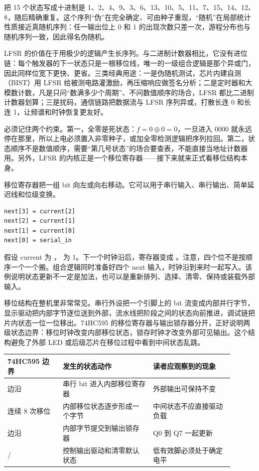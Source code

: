 把 15 个状态写成十进制是 1、2、4、9、3、6、13、10、5、11、7、15、14、12、8，随后精确重复。这个序列“伪”在完全确定、可由种子重现，“随机”在局部统计性质接近真随机序列：任一输出位上 0 和 1 的出现次数只差一次，游程分布也与随机序列一致，因此得名伪随机。

LFSR 的价值在于用极少的逻辑产生长序列。与二进制计数器相比，它没有进位链：每个触发器的下一状态只是一根移位线，唯一的一级组合逻辑是那个异或门，因此同样位宽下更快、更省。三类经典用途：一是伪随机测试，芯片内建自测（BIST）用 LFSR 给被测电路灌激励，再压缩响应做签名分析；二是定时器和大模数计数，凡是只问“数满多少个周期”、不问数值顺序的场合，LFSR 都比二进制计数器划算；三是扰码，通信链路把数据流与 LFSR 序列异或，打散长连 0 和长连 1，让频谱和时钟恢复更友好。

必须记住两个约束。第一，全零是死状态：$f=0\oplus0=0$，一旦进入 0000 就永远停在那里，所以上电必须置入非零种子，或加全零检测逻辑把序列拉回。第二，状态顺序不是数值顺序，需要“第几号状态”的场合要查表，不能直接当地址计数器用。另外，LFSR 的内核正是一个移位寄存器——接下来就来正式看移位结构本身。

移位寄存器把一组 bit 向左或向右移动。它可以用于串行输入、串行输出、简单延迟线和位级变换。

\begin{lstlisting}
next[3] = current[2]
next[2] = current[1]
next[1] = current[0]
next[0] = serial_in
\end{lstlisting}



假设 current 为 ， 为 1。下一个时钟沿后，寄存器变成 。注意，四个位不是按顺序一个一个搬。组合逻辑同时准备好四个 next 输入，时钟沿到来时一起写入。该例说明状态更新不一定是加法，也可以是重新排列、选择、清零、保持或装载外部输入。

移位结构在整机里非常常见。串行外设把一个引脚上的 bit 流变成内部并行字节，显示驱动把内部字节逐位送到外部，流水线把阶段之间的状态向前推进，调试链把片内状态一位一位移出。74HC595 的移位寄存器与输出锁存器分开，正好说明两级状态边界：移位时钟改变内部移位状态，锁存时钟才改变外部可见输出。这个结构避免了外部 LED 或后级芯片在移位过程中看到中间状态乱跳。

\begin{longtable}{L{0.22\linewidth}L{0.36\linewidth}L{0.32\linewidth}}
\toprule
74HC595 边界 & 发生的状态动作 & 读者应观察到的现象 \\
\midrule
{} 边沿 & 串行 bit 进入内部移位寄存器 & 外部输出可保持不变 \\\tablerowrule
连续 8 次移位 & 内部移位状态逐步形成一个字节 & 中间状态不应直接驱动负载 \\\tablerowrule
{} 边沿 & 内部字节提交到输出锁存器 & Q0 到 Q7 一起更新 \\\tablerowrule
{}/ & 控制输出驱动和清零默认状态 & 低有效脚必须处于确定电平 \\
\bottomrule
\end{longtable}

